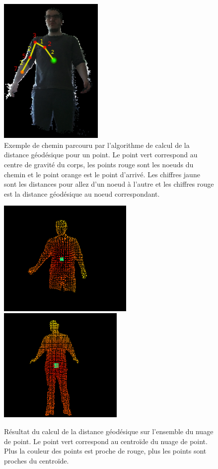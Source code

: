 \begin{figure}[!ht]
  \begin{center}
    \includegraphics[width=5cm]{image/cheminGeodesique.PNG}
    \caption{Exemple de chemin parcouru par l'algorithme de calcul de la distance géodésique pour un point.
    Le point vert correspond au centre de gravité du corps, les points rouge sont les noeuds du chemin et le point 
    orange est le point d'arrivé. Les chiffres jaune sont les distances pour allez d'un noeud à l'autre et les chiffres
    rouge est la distance géodésique au noeud correspondant.}
    \label{fig:cheminGeodesique}
  \end{center}
\end{figure}

\begin{figure}[!ht]
  \begin{center}
    \includegraphics[width=6.5cm]{image/geodesic1.PNG}
    \includegraphics[width=6cm]{image/geodesic2.PNG}
    \caption{Résultat du calcul de la distance géodésique sur l'ensemble du nuage de point. Le point vert correspond au centroïde du
    nuage de point. Plus la couleur des points est proche de rouge, plus les points sont proches du centroïde.}
    \label{fig:geodesique}
  \end{center}
\end{figure}


